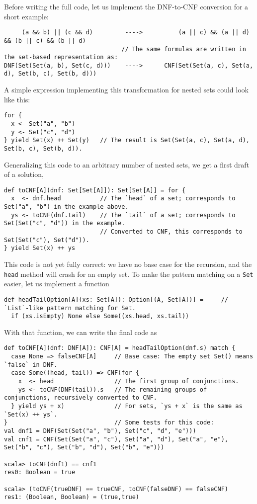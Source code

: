Before writing the full code, let us implement the DNF-to-CNF conversion
for a short example: 
\begin{lstlisting}
     (a && b) || (c && d)         ---->          (a || c) && (a || d) && (b || c) && (b || d)
                                 // The same formulas are written in the set-based representation as:
DNF(Set(Set(a, b), Set(c, d)))    ---->      CNF(Set(Set(a, c), Set(a, d), Set(b, c), Set(b, d)))
\end{lstlisting}
A simple expression implementing this transformation for nested sets
could look like this: 
\begin{lstlisting}
for {
  x <- Set("a", "b")
  y <- Set("c", "d")
} yield Set(x) ++ Set(y)   // The result is Set(Set(a, c), Set(a, d), Set(b, c), Set(b, d)).
\end{lstlisting}
Generalizing this code to an arbitrary number of nested sets, we get
a first draft of a solution,
\begin{lstlisting}
def toCNF[A](dnf: Set[Set[A]]): Set[Set[A]] = for {
  x  <- dnf.head           // The `head` of a set; corresponds to Set("a", "b") in the example above.
  ys <- toCNF(dnf.tail)    // The `tail` of a set; corresponds to Set(Set("c", "d")) in the example.
                           // Converted to CNF, this corresponds to Set(Set("c"), Set("d")).
} yield Set(x) ++ ys  
\end{lstlisting}
This code is not yet fully correct: we have no base case for the recursion,
and the \lstinline!head! method will crash for an empty set. To make
the pattern matching on a \lstinline!Set! easier, let us implement
a function
\begin{lstlisting}
def headTailOption[A](xs: Set[A]): Option[(A, Set[A])] =     // `List`-like pattern matching for Set.
  if (xs.isEmpty) None else Some((xs.head, xs.tail))
\end{lstlisting}
With that function, we can write the final code as
\begin{lstlisting}
def toCNF[A](dnf: DNF[A]): CNF[A] = headTailOption(dnf.s) match {
  case None => falseCNF[A]     // Base case: The empty set Set() means `false` in DNF.
  case Some((head, tail)) => CNF(for {
    x  <- head                 // The first group of conjunctions.
    ys <- toCNF(DNF(tail)).s   // The remaining groups of conjunctions, recursively converted to CNF.
  } yield ys + x)              // For sets, `ys + x` is the same as `Set(x) ++ ys`.
}                              // Some tests for this code:
val dnf1 = DNF(Set(Set("a", "b"), Set("c", "d", "e")))
val cnf1 = CNF(Set(Set("a", "c"), Set("a", "d"), Set("a", "e"), Set("b", "c"), Set("b", "d"), Set("b", "e")))

scala> toCNF(dnf1) == cnf1
res0: Boolean = true 

scala> (toCNF(trueDNF) == trueCNF, toCNF(falseDNF) == falseCNF)
res1: (Boolean, Boolean) = (true,true)
\end{lstlisting}

